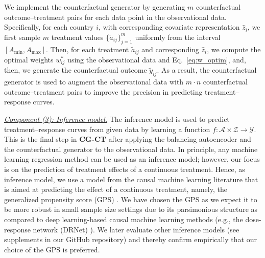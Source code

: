 \documentclass[sigconf]{acmart}
\newcommand{\framework}{\textbf{\mbox{CG-CT}}\xspace}
\begin{document}
We implement the counterfactual generator by generating $m$ counterfactual outcome--treatment pairs for each data point in the observational data. Specifically, for each country $i$, with corresponding covariate representation $\hat{z}_i$, we first sample $m$ treatment values $\{ \tilde{a}_{ij}\}_{j=1}^m$ uniformly from the interval $[A_{\mathrm{min}}, A_{\mathrm{max}}]$. Then, for each treatment $\tilde{a}_{ij}$ and corresponding $\hat{z}_i$, we compute the optimal weights $w_{ij}^*$ using the observational data and Eq.~\eqref{eq:w_optim}, and, then, we generate the counterfactual outcome $\tilde{y}_{ij}$. As a result, the counterfactual generator is used to augment the observational data with $m \cdot n$ counterfactual outcome--treatment pairs to improve the precision in predicting treatment--response curves. 


\noindent
\underline{\emph{Component (3): Inference model.}} The inference model is used to predict treatment--response curves from given data by learning a function $f: \mathcal{A} \times \mathcal{Z} \rightarrow \mathcal{Y}$. This is the final step in \framework after applying the balancing autoencoder and the counterfactual generator to the observational data. In principle, any machine learning regression method can be used as an inference model; however, our focus is on the prediction of treatment effects of a continuous treatment. Hence, as inference model, we use a model from the causal machine learning literature that is aimed at predicting the effect of a continuous treatment, namely, the generalized propensity score (GPS) \cite{Hirano2004}. We have chosen the GPS as we expect it to be more robust in small sample size settings due to its parsimonious structure as compared to deep learning-based causal machine learning methods (e.g., the dose-response network (DRNet) \cite{Schwab2020}). We later evaluate other inference models (see supplements in our GitHub repository) and thereby confirm empirically that our choice of the GPS is preferred.
\end{document}
